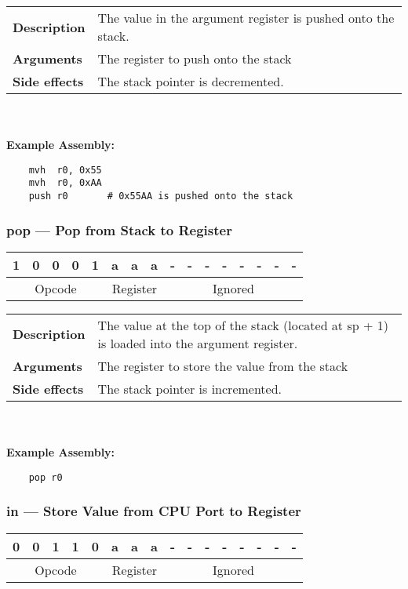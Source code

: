 \documentclass[titlepage]{article}
\begin{document}
\begin{tabular}{l p{8cm}}
{\bf Description} & The value in the argument register is pushed onto the stack. \\
{\bf Arguments} & The register to push onto the stack \\
{\bf Side effects} & The stack pointer is decremented. \\
\end{tabular}\\ \\
{\bf Example Assembly:}
\begin{verbatim}
    mvh  r0, 0x55
    mvh  r0, 0xAA
    push r0       # 0x55AA is pushed onto the stack
\end{verbatim}

\subsubsection{pop --- Pop from Stack to Register}\begin{center}
\begin{tabular}{|c|c|c|c|c|c|c|c|c|c|c|c|c|c|c|c|}
\hline
1 & 0 & 0 & 0 & 1 & a & a & a & - & - & - & - & - & - & - & - \\
\hline
\multicolumn{5}{|c}{Opcode} &
\multicolumn{3}{|c}{Register} &
\multicolumn{8}{|c|}{Ignored} \\
\hline
\end{tabular}
\end{center}

\begin{tabular}{l p{8cm}}
{\bf Description} & The value at the top of the stack (located at sp + 1) is loaded into the argument register. \\
{\bf Arguments} & The register to store the value from the stack \\
{\bf Side effects} & The stack pointer is incremented. \\
\end{tabular}\\ \\
{\bf Example Assembly:}
\begin{verbatim}
    pop r0
\end{verbatim}

\subsubsection{in --- Store Value from CPU Port to Register}\begin{center}
\begin{tabular}{|c|c|c|c|c|c|c|c|c|c|c|c|c|c|c|c|}
\hline
0 & 0 & 1 & 1 & 0 & a & a & a & - & - & - & - & - & - & - & - \\
\hline
\multicolumn{5}{|c}{Opcode} &
\multicolumn{3}{|c}{Register} &
\multicolumn{8}{|c|}{Ignored} \\
\hline
\end{tabular}
\end{center}
\end{document}
